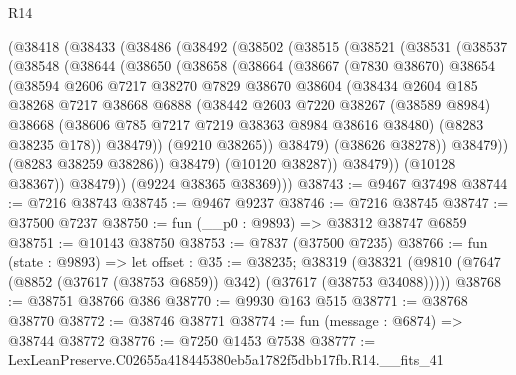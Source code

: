 \begin{lexlean}{R14}
\begin{coremodule}
    (@38418
      (@38433
        (@38486
          (@38492
            (@38502
              (@38515
                (@38521
                  (@38531
                    (@38537
                      (@38548
                        (@38644
                          (@38650
                            (@38658
                              (@38664
                                (@38667
                                  (@7830 @38670)
                                  @38654
                                  (@38594
                                    @2606
                                    @7217
                                    @38270
                                    @7829
                                    @38670
                                    @38604
                                    (@38434
                                      @2604
                                      @185
                                      @38268
                                      @7217
                                      @38668
                                      @6888
                                      (@38442
                                        @2603
                                        @7220
                                        @38267
                                        (@38589 @8984)
                                        @38668
                                        (@38606 @785 @7217 @7219 @38363 @8984 @38616 @38480)
                                        (@8283 @38235 @178))
                                      @38479))
                                  (@9210 @38265))
                                @38479)
                              (@38626 @38278))
                            @38479))
                        (@8283 @38259 @38286))
                      @38479)
                    (@10120 @38287))
                  @38479))
              (@10128 @38367))
            @38479))
        (@9224 @38365 @38369)))
@38743 := @9467 @37498
@38744 := @7216 @38743
@38745 := @9467 @9237
@38746 := @7216 @38745
@38747 := @37500 @7237
@38750 := fun (__p0 : @9893) => @38312 @38747 @6859
@38751 := @10143 @38750
@38753 := @7837 (@37500 @7235)
@38766 := fun (state : @9893) =>
  let offset : @35 := @38235;
  @38319 (@38321 (@9810 (@7647 (@8852 (@37617 (@38753 @6859)) @342) (@37617 (@38753 @34088)))))
@38768 := @38751 @38766 @386
@38770 := @9930 @163 @515
@38771 := @38768 @38770
@38772 := @38746 @38771
@38774 := fun (message : @6874) => @38744 @38772
@38776 := @7250 @1453 @7538
@38777 := LexLeanPreserve.C02655a418445380eb5a1782f5dbb17fb.R14.__fits_41

\end{coremodule}
\end{lexlean}
